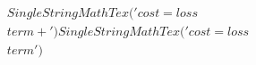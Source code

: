 \documentclass[preview]{standalone}
\begin{document}
\begin{align*}
SingleStringMathTex('cost = loss\\ term +') SingleStringMathTex('cost = loss\\ term')
\end{align*}
\end{document}
